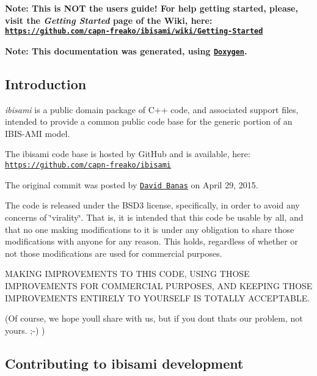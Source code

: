 {\bfseries Note\+: This is N\+O\+T the user\textquotesingle{}s guide! For help getting started, please, visit the {\itshape Getting Started} page of the Wiki, here\+: \href{https://github.com/capn-freako/ibisami/wiki/Getting-Started}{\tt https\+://github.\+com/capn-\/freako/ibisami/wiki/\+Getting-\/\+Started}}

{\bfseries Note\+: This documentation was generated, using \href{http://www.stack.nl/~dimitri/doxygen/index.html}{\tt Doxygen}.}

\subsection*{Introduction}

{\itshape ibisami} is a public domain package of C++ code, and associated support files, intended to provide a common public code base for the generic portion of an I\+B\+I\+S-\/\+A\+M\+I model.

The ibisami code base is hosted by Git\+Hub and is available, here\+: \href{https://github.com/capn-freako/ibisami}{\tt https\+://github.\+com/capn-\/freako/ibisami}

The original commit was posted by \href{mailto:capn.freako@gmail.com}{\tt David Banas} on April 29, 2015.

The code is released under the B\+S\+D3 license, specifically, in order to avoid any concerns of \char`\"{}virality\char`\"{}. That is, it is intended that this code be usable by all, and that no one making modifications to it is under any obligation to share those modifications with anyone for any reason. This holds, regardless of whether or not those modifications are used for commercial purposes.

M\+A\+K\+I\+N\+G I\+M\+P\+R\+O\+V\+E\+M\+E\+N\+T\+S T\+O T\+H\+I\+S C\+O\+D\+E, U\+S\+I\+N\+G T\+H\+O\+S\+E I\+M\+P\+R\+O\+V\+E\+M\+E\+N\+T\+S F\+O\+R C\+O\+M\+M\+E\+R\+C\+I\+A\+L P\+U\+R\+P\+O\+S\+E\+S, A\+N\+D K\+E\+E\+P\+I\+N\+G T\+H\+O\+S\+E I\+M\+P\+R\+O\+V\+E\+M\+E\+N\+T\+S E\+N\+T\+I\+R\+E\+L\+Y T\+O Y\+O\+U\+R\+S\+E\+L\+F I\+S T\+O\+T\+A\+L\+L\+Y A\+C\+C\+E\+P\+T\+A\+B\+L\+E.

(Of course, we hope you\textquotesingle{}ll share with us, but if you don\textquotesingle{}t that\textquotesingle{}s our problem, not yours. ;-\/) )

\subsection*{Contributing to ibisami development}


